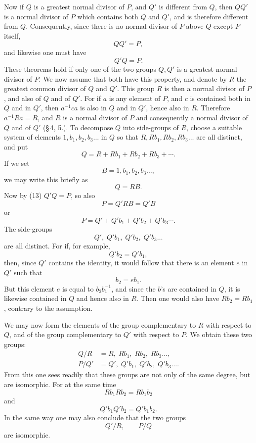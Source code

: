 \documentclass[11pt]{article}
\begin{document}
Now if $Q$ is a greatest normal divisor of $P$, and $Q'$ is different from $Q$, then $QQ'$ is a normal divisor of $P$ which contains both $Q$ and $Q'$, and is therefore different from $Q$. Consequently, since there is no normal divisor of $P$ above $Q$ except $P$ itself,
\begin{equation}
QQ'=P,
\tag{16}
\end{equation}
and likewise one must have
\begin{equation}
Q'Q=P.
\tag{17}
\end{equation}
These theorems hold if only one of the two groups $Q,Q'$ is a greatest normal divisor of $P$. We now assume that both have this property, and denote by $R$ the greatest common divisor of $Q$ and $Q'$. This group $R$ is then a normal divisor of $P$, and also of $Q$ and of $Q'$. For if $a$ is any element of $P$, and $c$ is contained both in $Q$ and in $Q'$, then $a^{-1}ca$ is also in $Q$ and in $Q'$, hence also in $R$. Therefore $a^{-1}Ra=R$, and $R$ is a normal divisor of $P$ and consequently a normal divisor of $Q$ and of $Q'$ (\S\,4, 5.). To decompose $Q$ into side-groups of $R$, choose a suitable system of elements $1,b_1,b_2,b_3\ldots$ in $Q$ so that $R,Rb_1,Rb_2,Rb_3\ldots$ are all distinct, and put
\[
Q=R+Rb_1+Rb_2+Rb_3+\cdots.
\]
If we set
\begin{equation}
B=1,b_1,b_2,b_3\ldots,
\tag{18}
\end{equation}
we may write this briefly as
\begin{equation}
Q=RB.
\tag{19}
\end{equation}
Now by (13) $Q'Q=P$, so also
\begin{equation}
P=Q'RB=Q'B
\tag{20}
\end{equation}
or
\[
P=Q'+Q'b_1+Q'b_2+Q'b_3\cdots.
\]
The side-groups
\begin{equation}
Q',\;Q'b_1,\;Q'b_2,\;Q'b_3\ldots
\tag{21}
\end{equation}
are all distinct. For if, for example,
\[
Q'b_2=Q'b_1,
\]
then, since $Q'$ contains the identity, it would follow that there is an element $e$ in $Q'$ such that
\[
b_2=eb_1.
\]
But this element $e$ is equal to $b_2b_1^{-1}$, and since the $b$'s are contained in $Q$, it is likewise contained in $Q$ and hence also in $R$. Then one would also have $Rb_2=Rb_1$, contrary to the assumption.

We may now form the elements of the group complementary to $R$ with respect to $Q$, and of the group complementary to $Q'$ with respect to $P$. We obtain these two groups:
\begin{equation}
\begin{array}{ll}
Q/R &= R,\;Rb_1,\;Rb_2,\;Rb_3\ldots,\\
P/Q' &= Q',\;Q'b_1,\;Q'b_2,\;Q'b_3\ldots.
\end{array}
\tag{22}
\end{equation}
From this one sees readily that these groups are not only of the same degree, but are isomorphic. For at the same time
\[
Rb_1Rb_2=Rb_1b_2
\]
and
\[
Q'b_1Q'b_2=Q'b_1b_2.
\]
In the same way one may also conclude that the two groups
\[
Q'/R,
\qquad P/Q
\]
are isomorphic.
\end{document}
